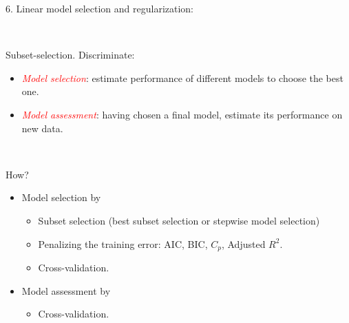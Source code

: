\documentclass[10pt,ignorenonframetext,]{beamer}
\providecommand{\tightlist}{%
  \setlength{\itemsep}{0pt}\setlength{\parskip}{0pt}}
\begin{document}
\begin{frame}

\begin{block}{6. Linear model selection and regularization:}

\(~\)

Subset-selection. Discriminate: \vspace{2mm}

\begin{itemize}
\tightlist
\item
  \emph{\textcolor{red}{Model selection}}: estimate performance of
  different models to choose the best one.
\item
  \emph{\textcolor{red}{Model assessment}}: having chosen a final model,
  estimate its performance on new data.
\end{itemize}

\(~\)

How?

\vspace{2mm}

\begin{itemize}
\tightlist
\item
  Model selection by

  \begin{itemize}
  \tightlist
  \item
    Subset selection (best subset selection or stepwise model selection)
  \item
    Penalizing the training error: AIC, BIC, \(C_p\), Adjusted \(R^2\).
  \item
    Cross-validation.
  \end{itemize}
\end{itemize}

\vspace{2mm}

\begin{itemize}
\tightlist
\item
  Model assessment by

  \begin{itemize}
  \tightlist
  \item
    Cross-validation.
  \end{itemize}
\end{itemize}

\end{block}

\end{frame}
\end{document}
